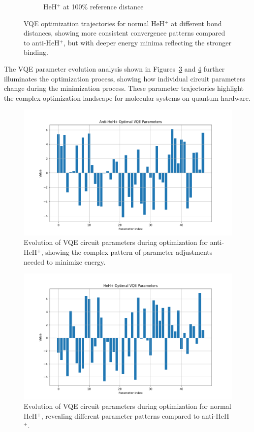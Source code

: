 \documentclass[10pt,twocolumn,a4paper]{article}
\begin{document}
\begin{figure}[t!]
\begin{subfigure}[b]{0.32\textwidth}
        \caption{HeH$^+$ at 100\% reference distance}
        \label{fig:vqe_progress_normal_100}
    \end{subfigure}
    \caption{VQE optimization trajectories for normal HeH$^+$ at different bond distances, showing more consistent convergence patterns compared to anti-HeH$^+$, but with deeper energy minima reflecting the stronger binding.}
    \label{fig:vqe_progress_normal}
\end{figure}

The VQE parameter evolution analysis shown in Figures~\ref{fig:vqe_parameters_anti} and \ref{fig:vqe_parameters_normal} further illuminates the optimization process, showing how individual circuit parameters change during the minimization process. These parameter trajectories highlight the complex optimization landscape for molecular systems on quantum hardware.

\begin{figure}[t!]
    \centering
    \includegraphics[width=\columnwidth]{graphs/vqe_parameters_anti_heh+.png}
    \caption{Evolution of VQE circuit parameters during optimization for anti-HeH$^+$, showing the complex pattern of parameter adjustments needed to minimize energy.}
    \label{fig:vqe_parameters_anti}
\end{figure}

\begin{figure}[t!]
    \centering
    \includegraphics[width=\columnwidth]{graphs/vqe_parameters_heh+.png}
    \caption{Evolution of VQE circuit parameters during optimization for normal HeH$^+$, revealing different parameter patterns compared to anti-HeH$^+$.}
    \label{fig:vqe_parameters_normal}
\end{figure}
\end{document}
